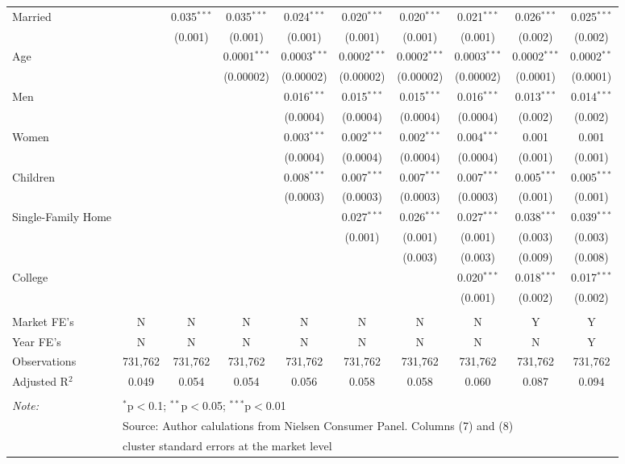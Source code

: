 \begin{table}[!htbp]
\begin{tabular}{@{\extracolsep{5pt}}lccccccccc}
  Married &  & 0.035$^{***}$ & 0.035$^{***}$ & 0.024$^{***}$ & 0.020$^{***}$ & 0.020$^{***}$ & 0.021$^{***}$ & 0.026$^{***}$ & 0.025$^{***}$ \\ 
  &  & (0.001) & (0.001) & (0.001) & (0.001) & (0.001) & (0.001) & (0.002) & (0.002) \\ 
  Age &  &  & 0.0001$^{***}$ & 0.0003$^{***}$ & 0.0002$^{***}$ & 0.0002$^{***}$ & 0.0003$^{***}$ & 0.0002$^{***}$ & 0.0002$^{**}$ \\ 
  &  &  & (0.00002) & (0.00002) & (0.00002) & (0.00002) & (0.00002) & (0.0001) & (0.0001) \\ 
  Men &  &  &  & 0.016$^{***}$ & 0.015$^{***}$ & 0.015$^{***}$ & 0.016$^{***}$ & 0.013$^{***}$ & 0.014$^{***}$ \\ 
  &  &  &  & (0.0004) & (0.0004) & (0.0004) & (0.0004) & (0.002) & (0.002) \\ 
  Women &  &  &  & 0.003$^{***}$ & 0.002$^{***}$ & 0.002$^{***}$ & 0.004$^{***}$ & 0.001 & 0.001 \\ 
  &  &  &  & (0.0004) & (0.0004) & (0.0004) & (0.0004) & (0.001) & (0.001) \\ 
  Children &  &  &  & 0.008$^{***}$ & 0.007$^{***}$ & 0.007$^{***}$ & 0.007$^{***}$ & 0.005$^{***}$ & 0.005$^{***}$ \\ 
  &  &  &  & (0.0003) & (0.0003) & (0.0003) & (0.0003) & (0.001) & (0.001) \\ 
  Single-Family Home &  &  &  &  & 0.027$^{***}$ & 0.026$^{***}$ & 0.027$^{***}$ & 0.038$^{***}$ & 0.039$^{***}$ \\ 
  &  &  &  &  & (0.001) & (0.001) & (0.001) & (0.003) & (0.003) \\ 
  &  &  &  &  &  & (0.003) & (0.003) & (0.009) & (0.008) \\ 
  College &  &  &  &  &  &  & 0.020$^{***}$ & 0.018$^{***}$ & 0.017$^{***}$ \\ 
  &  &  &  &  &  &  & (0.001) & (0.002) & (0.002) \\ 
 \hline \\[-1.8ex] 
Market FE's & N & N & N & N & N & N & N & Y & Y \\ 
Year FE's & N & N & N & N & N & N & N & N & Y \\ 
Observations & 731,762 & 731,762 & 731,762 & 731,762 & 731,762 & 731,762 & 731,762 & 731,762 & 731,762 \\ 
Adjusted R$^{2}$ & 0.049 & 0.054 & 0.054 & 0.056 & 0.058 & 0.058 & 0.060 & 0.087 & 0.094 \\ 
\hline 
\hline \\[-1.8ex] 
\textit{Note:}  & \multicolumn{9}{l}{$^{*}$p$<$0.1; $^{**}$p$<$0.05; $^{***}$p$<$0.01} \\ 
 & \multicolumn{9}{l}{Source: Author calulations from Nielsen Consumer Panel. Columns (7) and (8) } \\ 
 & \multicolumn{9}{l}{cluster standard errors at the market level} \\ 
\end{tabular} 
\end{table} 
